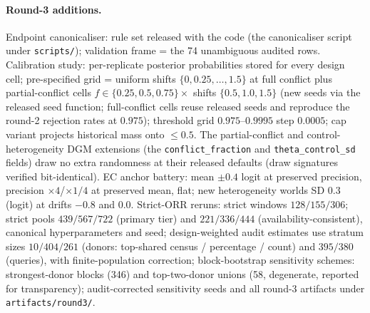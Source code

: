 \documentclass[11pt]{article}
\begin{document}
\paragraph{Round-3 additions.} Endpoint canonicaliser: rule set released
with the code (the canonicaliser script under \texttt{scripts/});
validation frame =
the 74 unambiguous audited rows. Calibration study: per-replicate posterior
probabilities stored for every design cell; pre-specified grid = uniform
shifts $\{0,0.25,\dots,1.5\}$ at full conflict plus partial-conflict cells
$f\in\{0.25,0.5,0.75\}\times$ shifts $\{0.5,1.0,1.5\}$ (new seeds via the
released seed function; full-conflict cells reuse released seeds and
reproduce the round-2 rejection rates at $0.975$); threshold grid
$0.975$--$0.9995$ step $0.0005$; cap variant projects historical mass onto
$\le 0.5$. The partial-conflict and control-heterogeneity DGM extensions
(the \texttt{conflict\_fraction} and \texttt{theta\_control\_sd} fields)
draw no extra
randomness at their released defaults (draw signatures verified
bit-identical). EC anchor battery: mean $\pm0.4$ logit at preserved
precision, precision $\times4$/$\times1/4$ at preserved mean, flat; new
heterogeneity worlds SD $0.3$ (logit) at drifts $-0.8$ and $0.0$. Strict-ORR
reruns: strict windows $128/155/306$; strict pools $439/567/722$ (primary
tier) and $221/336/444$ (availability-consistent), canonical
hyperparameters and seed; design-weighted audit estimates use stratum sizes
$10/404/261$ (donors: top-shared census / percentage / count) and
$395/380$ (queries), with finite-population correction; block-bootstrap
sensitivity schemes: strongest-donor blocks (346) and top-two-donor unions
(58, degenerate, reported for transparency); audit-corrected sensitivity
seeds and all round-3 artifacts under
\texttt{artifacts/\allowbreak round3/}.
\end{document}
